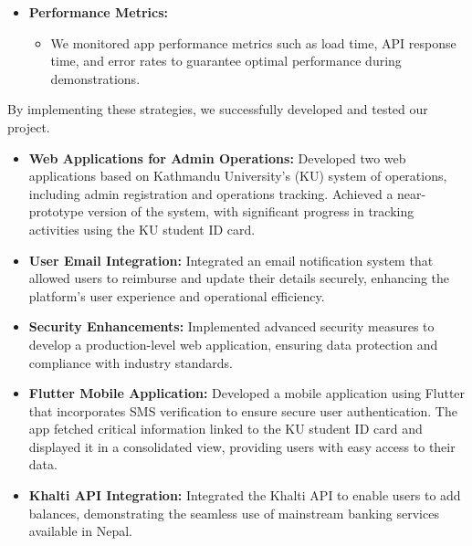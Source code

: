 \documentclass[a4paper,14pt]{article}
\begin{document}
{{{{{{{{{{{{{{{\begin{itemize}
				\item \textbf{Performance Metrics:}
				\begin{itemize}
					\item We monitored app performance metrics such as load time, API response time, and error rates to guarantee optimal performance during demonstrations.
				\end{itemize}
			\end{itemize}
			
			By implementing these strategies, we successfully developed and tested our project.
			
		\vspace{0.5cm}
		
		\newpage
		
		{
			\noindent \normalsize
			\justifying \begin{itemize}
				\item \textbf{Web Applications for Admin Operations:} Developed two web applications based on Kathmandu University's (KU) system of operations, including admin registration and operations tracking. Achieved a near-prototype version of the system, with significant progress in tracking activities using the KU student ID card.
				
				\item \textbf{User Email Integration:} Integrated an email notification system that allowed users to reimburse and update their details securely, enhancing the platform’s user experience and operational efficiency.
				
				\item \textbf{Security Enhancements:} Implemented advanced security measures to develop a production-level web application, ensuring data protection and compliance with industry standards.
				
				\item \textbf{Flutter Mobile Application:} Developed a mobile application using Flutter that incorporates SMS verification to ensure secure user authentication. The app fetched critical information linked to the KU student ID card and displayed it in a consolidated view, providing users with easy access to their data.
				
				\item \textbf{Khalti API Integration:} Integrated the Khalti API to enable users to add balances, demonstrating the seamless use of mainstream banking services available in Nepal.
			\end{itemize} 
		\vspace{0.5cm}
		
}}}}}}}}}}}}}}}}
\end{document}
